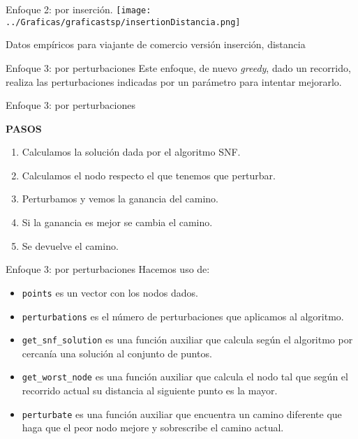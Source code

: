\documentclass[10pt, xcolor=table]{beamer}
\begin{document}
\begin{frame}[fragile]{Enfoque 2: por inserción. }
\texttt{[image: ../Graficas/graficastsp/insertionDistancia.png]}
\begin{center}
	\footnotesize{Datos empíricos para viajante de comercio versión inserción, distancia}
\end{center}
\end{frame}


\begin{frame}{Enfoque 3: por perturbaciones}
Este enfoque, de nuevo \emph{greedy}, dado un recorrido, realiza las perturbaciones indicadas por un parámetro para intentar mejorarlo.
\end{frame}

\begin{frame}{Enfoque 3: por perturbaciones}
\begin{center}
\textbf{\large{PASOS}}
\end{center}
\begin{enumerate}
	\item Calculamos la solución dada por el algoritmo SNF.
	\item Calculamos el nodo respecto el que tenemos que perturbar.
	\item Perturbamos y vemos la ganancia del camino.
	\item Si la ganancia es mejor se cambia el camino.
	\item Se devuelve el camino.
\end{enumerate}
\end{frame}

\begin{frame}{Enfoque 3: por perturbaciones}
Hacemos uso de:

\begin{itemize}
	\item \texttt{points} es un vector con los nodos dados. 
	\item \texttt{perturbations} es el número de perturbaciones que aplicamos al algoritmo. 
	\item \texttt{get\_snf\_solution} es una función auxiliar que calcula según el algoritmo por cercanía una solución al conjunto de puntos.
	\item \texttt{get\_worst\_node} es una función auxiliar que calcula el nodo tal que según el recorrido actual su distancia al siguiente punto es la mayor.
	\item \texttt{perturbate} es una función auxiliar que encuentra un camino diferente que haga que el peor nodo mejore y sobrescribe el camino actual.
\end{itemize}
\end{frame}
\end{document}
